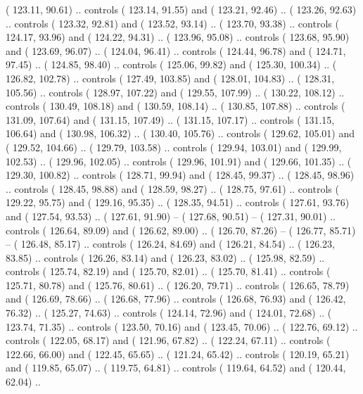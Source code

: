 {        ( 123.11,  90.61) .. controls ( 123.14,  91.55) and ( 123.21,  92.46) ..
        ( 123.26,  92.63) .. controls ( 123.32,  92.81) and ( 123.52,  93.14) ..
        ( 123.70,  93.38) .. controls ( 124.17,  93.96) and ( 124.22,  94.31) ..
        ( 123.96,  95.08) .. controls ( 123.68,  95.90) and ( 123.69,  96.07) ..
        ( 124.04,  96.41) .. controls ( 124.44,  96.78) and ( 124.71,  97.45) ..
        ( 124.85,  98.40) .. controls ( 125.06,  99.82) and ( 125.30, 100.34) ..
        ( 126.82, 102.78) .. controls ( 127.49, 103.85) and ( 128.01, 104.83) ..
        ( 128.31, 105.56) .. controls ( 128.97, 107.22) and ( 129.55, 107.99) ..
        ( 130.22, 108.12) .. controls ( 130.49, 108.18) and ( 130.59, 108.14) ..
        ( 130.85, 107.88) .. controls ( 131.09, 107.64) and ( 131.15, 107.49) ..
        ( 131.15, 107.17) .. controls ( 131.15, 106.64) and ( 130.98, 106.32) ..
        ( 130.40, 105.76) .. controls ( 129.62, 105.01) and ( 129.52, 104.66) ..
        ( 129.79, 103.58) .. controls ( 129.94, 103.01) and ( 129.99, 102.53) ..
        ( 129.96, 102.05) .. controls ( 129.96, 101.91) and ( 129.66, 101.35) ..
        ( 129.30, 100.82) .. controls ( 128.71,  99.94) and ( 128.45,  99.37) ..
        ( 128.45,  98.96) .. controls ( 128.45,  98.88) and ( 128.59,  98.27) ..
        ( 128.75,  97.61) .. controls ( 129.22,  95.75) and ( 129.16,  95.35) ..
        ( 128.35,  94.51) .. controls ( 127.61,  93.76) and ( 127.54,  93.53) ..
        ( 127.61,  91.90) -- 
        ( 127.68,  90.51) -- 
        ( 127.31,  90.01) .. controls ( 126.64,  89.09) and ( 126.62,  89.00) ..
        ( 126.70,  87.26) -- 
        ( 126.77,  85.71) -- 
        ( 126.48,  85.17) .. controls ( 126.24,  84.69) and ( 126.21,  84.54) ..
        ( 126.23,  83.85) .. controls ( 126.26,  83.14) and ( 126.23,  83.02) ..
        ( 125.98,  82.59) .. controls ( 125.74,  82.19) and ( 125.70,  82.01) ..
        ( 125.70,  81.41) .. controls ( 125.71,  80.78) and ( 125.76,  80.61) ..
        ( 126.20,  79.71) .. controls ( 126.65,  78.79) and ( 126.69,  78.66) ..
        ( 126.68,  77.96) .. controls ( 126.68,  76.93) and ( 126.42,  76.32) ..
        ( 125.27,  74.63) .. controls ( 124.14,  72.96) and ( 124.01,  72.68) ..
        ( 123.74,  71.35) .. controls ( 123.50,  70.16) and ( 123.45,  70.06) ..
        ( 122.76,  69.12) .. controls ( 122.05,  68.17) and ( 121.96,  67.82) ..
        ( 122.24,  67.11) .. controls ( 122.66,  66.00) and ( 122.45,  65.65) ..
        ( 121.24,  65.42) .. controls ( 120.19,  65.21) and ( 119.85,  65.07) ..
        ( 119.75,  64.81) .. controls ( 119.64,  64.52) and ( 120.44,  62.04) ..
}
